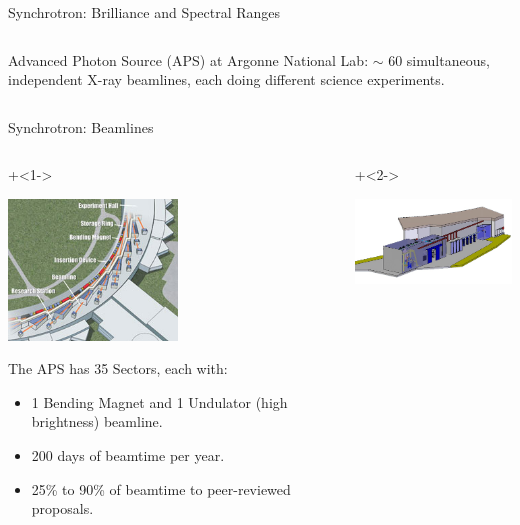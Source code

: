 \begin{slide}{Synchrotron: Brilliance and Spectral Ranges}
\begin{columns}[T]
\begin{column}{80mm}
      Advanced Photon Source (APS) at Argonne National Lab: $\sim$ 60
      simultaneous, independent X-ray beamlines, each doing different
      science experiments.

    \end{column}
  \end{columns}

\end{slide}


\begin{slide}{Synchrotron: Beamlines }

 \vmm
\begin{columns}[T]
  \begin{column}{55mm}
    \onslide+<1->{

    \begin{center}
      \includegraphics[width=45mm]{figs/misc/APS_aerial2}
    \end{center}

    The APS has 35 Sectors, each with:

    \begin{itemize}
        \item 1 Bending Magnet and 1 Undulator (high brightness)
          beamline.

        \item 200 days of beamtime per year.

        \item 25\% to 90\% of beamtime to peer-reviewed proposals.

        \end{itemize}
      }
      
    \end{column}
    \begin{column}{75mm}

      \onslide+<2->{
        \begin{center}
          \includegraphics[width=53mm]{figs/misc/APS_beamline_layout}
        \end{center}
        

}
\end{column}
\end{columns}
\end{slide}
